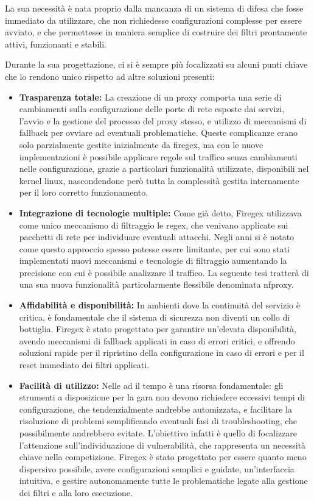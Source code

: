 La sua necessità è nata proprio dalla mancanza di un sistema di difesa che fosse immediato da utilizzare, che non richiedesse configurazioni complesse per essere avviato, e che permettesse in maniera semplice di costruire dei filtri prontamente attivi, funzionanti e stabili.

Durante la sua progettazione, ci si è sempre più focalizzati su alcuni punti chiave che lo rendono unico rispetto ad altre soluzioni presenti:

\begin{itemize}
    \setlength{\itemsep}{1pt}
    \setlength{\parskip}{1pt}
    \item \textbf{Trasparenza totale:} La creazione di un proxy comporta una serie di cambiamenti sulla configurazione delle porte di rete esposte dai servizi, l'avvio e la gestione del processo del proxy stesso, e utilizzo di meccanismi di fallback per ovviare ad eventuali problematiche. Queste complicanze erano solo parzialmente gestite inizialmente da firegex, ma con le nuove implementazioni è possibile applicare regole sul traffico senza cambiamenti nelle configurazione, grazie a particolari funzionalità utilizzate, disponibili nel kernel linux, nascondendone però tutta la complessità gestita internamente per il loro corretto funzionamento.
    \item \textbf{Integrazione di tecnologie multiple:} Come già detto, Firegex utilizzava come unico meccanismo di filtraggio le \gls{regex}, che venivano applicate sui pacchetti di rete per individuare eventuali attacchi. Negli anni si è notato come questo approccio spesso potesse essere limitante, per cui sono stati implementati nuovi meccanismi e tecnologie di filtraggio aumentando la precisione con cui è possibile analizzare il traffico. La seguente tesi tratterà di una sua nuova funzionalità particolarmente flessibile denominata \gls{nfproxy}.
    \item \textbf{Affidabilità e disponibilità:} In ambienti dove la continuità del servizio è critica, è fondamentale che il sistema di sicurezza non diventi un collo di bottiglia. Firegex è stato progettato per garantire un’elevata disponibilità, avendo meccanismi di fallback applicati in caso di errori critici, e offrendo soluzioni rapide per il ripristino della configurazione in caso di errori e per il reset immediato dei filtri applicati.
    \item \textbf{Facilità di utilizzo:} Nelle \gls{ad} il tempo è una risorsa fondamentale: gli strumenti a disposizione per la gara non devono richiedere eccessivi tempi di configurazione, che tendenzialmente andrebbe automizzata, e facilitare la risoluzione di problemi semplificando eventuali fasi di troubleshooting, che possibilmente andrebbero evitate. L'obiettivo infatti è quello di focalizzare l'attenzione sull'individuazione di vulnerabilità, che rappresenta un necessità chiave nella competizione. Firegex è stato progettato per essere quanto meno dispersivo possibile, avere configurazioni semplici e guidate, un'interfaccia intuitiva, e gestire autonomamente tutte le problematiche legate alla gestione dei filtri e alla loro esecuzione.
\end{itemize}

